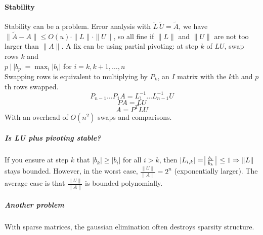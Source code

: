 \documentclass[10pt]{report}
\begin{document}
\paragraph{Stability} Stability can be a problem. Error analysis with $\tilde{L}\,\tilde{U} = \tilde{A}$, we have $\|\tilde{A}-A\|\leq O(u)\cdot\|L\|\cdot\|U\|$, so all fine if $\|L\|$ and $\|U\|$ are not too larger than $\|A\|$. A fix can be using partial pivoting: at step $k$ of $LU$, swap rows $k$ and\\$p\:|\:|b_p|=\max_i|b_i|$ for $i=k,k+1,\ldots,n$\\
Swapping rows is equivalent to multiplying by $P_k$, an $I$ matrix with the $k$th and $p$th rows swapped.
$$P_{n-1}\ldots P_1A=L_1^{-1}\ldots L_{n-1}^{-1}U$$
$$PA = LU$$
$$A = P^TLU$$
With an overhead of $O(n^2)$ swaps and comparisons.
\subparagraph{Is LU plus pivoting stable?} If you ensure at step $k$ that $|b_k|\geq |b_i|$ for all $i>k$, then $|L_{i,k}| = \:\vline\frac{b_i}{b_k}\:\vline\:\leq 1 \Rightarrow \|L\|$ stays bounded. However, in the worst case, $\frac{\|U\|}{\|A\|} = 2^n$ (exponentially larger). The average case is that $\frac{\|U\|}{\|A\|}$ is bounded polynomially.
\subparagraph{Another problem} With sparse matrices, the gaussian elimination often destroys sparsity structure.
\end{document}
